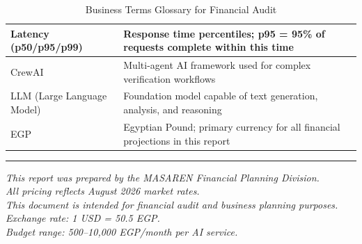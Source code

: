 \documentclass[11pt,a4paper]{article}
\begin{document}
\begin{table}[H]
\begin{tabular}{|p{3.5cm}|p{9.5cm}|}
\hline
Latency (p50/p95/p99) & Response time percentiles; p95 = 95\% of requests complete within this time \\
\hline
CrewAI & Multi-agent AI framework used for complex verification workflows \\
\hline
LLM (Large Language Model) & Foundation model capable of text generation, analysis, and reasoning \\
\hline
EGP & Egyptian Pound; primary currency for all financial projections in this report \\
\hline
\end{tabular}
\caption{Business Terms Glossary for Financial Audit}
\end{table}

\vspace{2em}

\begin{center}
\hrule
\vspace{1em}
\textit{This report was prepared by the MASAREN Financial Planning Division.\\
All pricing reflects August 2026 market rates.\\
This document is intended for financial audit and business planning purposes.\\
Exchange rate: 1 USD = 50.5 EGP.\\
Budget range: 500--10,000 EGP/month per AI service.}
\end{center}
\end{document}

